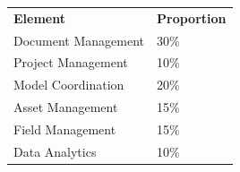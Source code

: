 \begin{table}[h!]
	\begin{center}
	\begin{tabular}{p{5cm}  p{5cm} }
     	\toprule
		\textbf{Element} & \textbf{Proportion} \\ 
    	\cmidrule(r){1-1}\cmidrule(lr){2-2}
      	Document Management & 30\%\\
      	Project Management & 10\%\\
      	Model Coordination & 20\%\\
      	Asset Management & 15\%\\
      	Field Management & 15\%\\
      	Data Analytics & 10\%\\
      	\bottomrule
    \end{tabular}
    \label{tbl:markSchemeAsmt2}
    \end{center}
\end{table}

